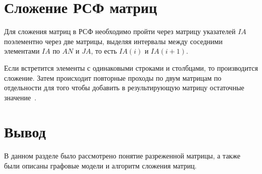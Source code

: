 \section{Сложение РСФ матриц}
Для сложения матриц в РСФ необходимо пройти через матрицу указателей $IA$ поэлементно через две матрицы, выделяя интервалы между соседними элементами $IA$ по $AN$ и $JA$, то есть $IA(i)$ и $IA(i + 1)$.

Если встретится элементы с одинаковыми строками и столбцами, то производится сложение. Затем происходит повторные проходы по двум матрицам по отдельности для того чтобы добавить в результирующую матрицу остаточные значение~\cite{csr}.

\section*{Вывод}
В данном разделе было рассмотрено понятие разреженной матрицы, а также были описаны графовые модели и алгоритм сложения матриц.